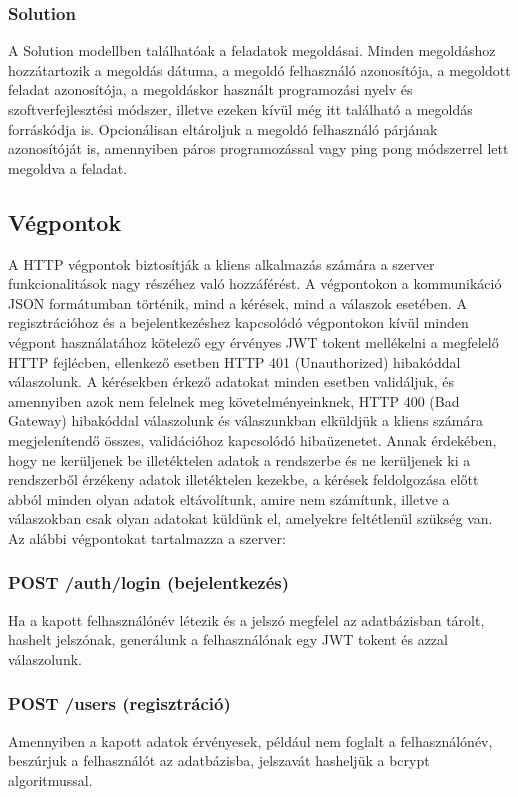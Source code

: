 \documentclass{elteikthesis}
\begin{document}
				\subsubsection{Solution}
					A Solution modellben találhatóak a feladatok megoldásai. Minden megoldáshoz hozzátartozik a megoldás dátuma, a megoldó felhasználó azonosítója, a megoldott feladat azonosítója, a megoldáskor használt programozási nyelv és szoftverfejlesztési módszer, illetve ezeken kívül még itt található a megoldás forráskódja is. Opcionálisan eltároljuk a megoldó felhasználó párjának azonosítóját is, amennyiben páros programozással vagy ping pong módszerrel lett megoldva a feladat.
			
			\subsection{Végpontok}
				A HTTP végpontok biztosítják a kliens alkalmazás számára a szerver funkcionalitások nagy részéhez való hozzáférést. A végpontokon a kommunikáció JSON formátumban történik, mind a kérések, mind a válaszok esetében. A regisztrációhoz és a bejelentkezéshez kapcsolódó végpontokon kívül minden végpont használatához kötelező egy érvényes JWT tokent mellékelni a megfelelő HTTP fejlécben, ellenkező esetben HTTP 401 (Unauthorized) hibakóddal válaszolunk. A kérésekben érkező adatokat minden esetben validáljuk, és amennyiben azok nem felelnek meg követelményeinknek, HTTP 400 (Bad Gateway) hibakóddal válaszolunk és válaszunkban elküldjük a kliens számára megjelenítendő összes, validációhoz kapcsolódó hibaüzenetet. Annak érdekében, hogy ne kerüljenek be illetéktelen adatok a rendszerbe és ne kerüljenek ki a rendszerből érzékeny adatok illetéktelen kezekbe, a kérések feldolgozása előtt abból minden olyan adatok eltávolítunk, amire nem számítunk, illetve a válaszokban csak olyan adatokat küldünk el, amelyekre feltétlenül szükség van. Az alábbi végpontokat tartalmazza a szerver:

				\subsubsection{POST /auth/login (bejelentkezés)}
					Ha a kapott felhasználónév létezik és a jelszó megfelel az adatbázisban tárolt, hashelt jelszónak, generálunk a felhasználónak egy JWT tokent és azzal válaszolunk.
				
				\subsubsection{POST /users (regisztráció)}
					Amennyiben a kapott adatok érvényesek, például nem foglalt a felhasználónév, beszúrjuk a felhasználót az adatbázisba, jelszavát hasheljük a bcrypt algoritmussal.
				
\end{document}
